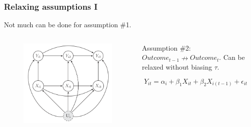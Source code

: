 \documentclass[11pt,english,dvipsnames,aspectratio=169,handout]{beamer}\usepackage[]{graphicx}\usepackage[]{xcolor}
\begin{document}
\begin{frame}
	\frametitle{Relaxing assumptions I}
	Not much can be done for assumption \#1.\bigskip
	
	\begin{columns}
		\begin{column}{0.65\textwidth}
			\begin{figure}
				\centering
				\includegraphics[scale=0.4]{../04-figures/09/02.PNG}
			\end{figure}
		\end{column}
		\begin{column}{0.35\textwidth}
			\footnotesize
				Assumption \#2: $Outcome_{t-1} \nrightarrow Outcome_t$. Can be relaxed without biasing $\tau$.\pause
				
				\begin{equation}
					Y_{it} = \alpha_i + \beta_1X_{it} + \beta_2X_{i(t-1)} + \epsilon_{it}\nonumber
				\end{equation}
		\end{column}
	\end{columns}

\end{frame}
\end{document}
